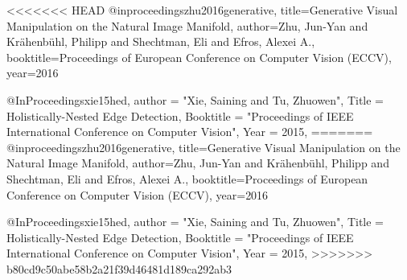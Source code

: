 <<<<<<< HEAD
@inproceedings{zhu2016generative,
  title={Generative Visual Manipulation on the Natural Image Manifold},
  author={Zhu, Jun-Yan and Kr{\"a}henb{\"u}hl, Philipp and Shechtman, Eli and Efros, Alexei A.},
  booktitle={Proceedings of European Conference on Computer Vision (ECCV)},
  year={2016}
}

@InProceedings{xie15hed,
  author = {"Xie, Saining and Tu, Zhuowen"},
  Title = {Holistically-Nested Edge Detection},
  Booktitle = "Proceedings of IEEE International Conference on Computer Vision",
  Year  = {2015},
}
=======
@inproceedings{zhu2016generative,
  title={Generative Visual Manipulation on the Natural Image Manifold},
  author={Zhu, Jun-Yan and Kr{\"a}henb{\"u}hl, Philipp and Shechtman, Eli and Efros, Alexei A.},
  booktitle={Proceedings of European Conference on Computer Vision (ECCV)},
  year={2016}
}

@InProceedings{xie15hed,
  author = {"Xie, Saining and Tu, Zhuowen"},
  Title = {Holistically-Nested Edge Detection},
  Booktitle = "Proceedings of IEEE International Conference on Computer Vision",
  Year  = {2015},
}
>>>>>>> b80cd9c50abe58b2a21f39d46481d189ca292ab3
